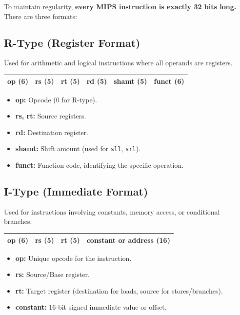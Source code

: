 To maintain regularity, \textbf{every MIPS instruction is exactly 32 bits long.} There are three formats:

\subsection{R-Type (Register Format)}
Used for arithmetic and logical instructions where all operands are registers.
\begin{table}[h]
\centering
\vspace{5pt}
\begin{tabular}{|c|c|c|c|c|c|}
\hline
\textbf{op} (6) & \textbf{rs} (5) & \textbf{rt} (5) & \textbf{rd} (5) & \textbf{shamt} (5) & \textbf{funct} (6) \\
\hline
\end{tabular}
\vspace{5pt}
\end{table}

\begin{itemize}
    \item \textbf{op:} Opcode (0 for R-type).
    \item \textbf{rs, rt:} Source registers.
    \item \textbf{rd:} Destination register.
    \item \textbf{shamt:} Shift amount (used for \texttt{sll}, \texttt{srl}).
    \item \textbf{funct:} Function code, identifying the specific operation.
\end{itemize}

\subsection{I-Type (Immediate Format)}
Used for instructions involving constants, memory access, or conditional branches.

\begin{table}[h]
\centering
\vspace{5pt}
\begin{tabular}{|c|c|c|c|}
\hline
\textbf{op} (6) & \textbf{rs} (5) & \textbf{rt} (5) & \textbf{constant or address} (16) \\
\hline
\end{tabular}
\vspace{5pt}
\end{table}

\begin{itemize}
    \item \textbf{op:} Unique opcode for the instruction.
    \item \textbf{rs:} Source/Base register.
    \item \textbf{rt:} Target register (destination for loads, source for stores/branches).
    \item \textbf{constant:} 16-bit signed immediate value or offset.
\end{itemize}

